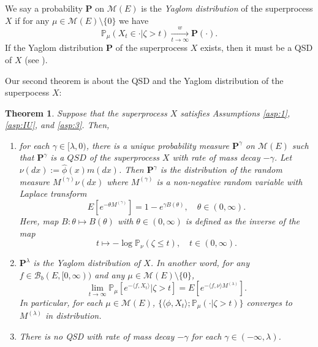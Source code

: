 \documentclass[12pt,a4paper]{amsart}
\numberwithin{equation}{section}
\theoremstyle{plain}
\newtheorem{thm}{Theorem}[section]
\theoremstyle{definition}
\begin{document}
We say a probability ${\mathbf P}$ on $\mathcal M(E)$ is the \emph{Yaglom distribution} of the superprocess $X$ if for any $\mu\in \mathcal M(E)\setminus\{0\}$ we have
\[
	\mathbb P_\mu(X_t \in \cdot | \zeta > t) \xrightarrow[t\to \infty]{w} {\mathbf P}(\cdot).
\]
If the Yaglom distribution ${\mathbf P}$ of the superprocess $X$ exists, then it must be a QSD of $X$ (see \cite{MeleardVillemonais2012Quasistationary}).

Our second theorem is about the QSD and the Yaglom distribution of the superpocess $X$:
\begin{thm}\label{thm:qsd_thm}
  Suppose that the superprocess $X$ satisfies Assumptions \ref{asp:1}, \ref{asp:IU}, and \ref{asp:3}.
  Then,
  \begin{enumerate}
  \item \label{thm:qsd_thm_1}
    for each $\gamma\in[\lambda,0)$, there is a unique probability measure ${\mathbf P}^{\gamma}$ on $\mathcal M(E)$ such that $ {\mathbf P}^\gamma$ is a $QSD$ of the superprocess $X$ with rate of mass decay $-\gamma$.
    Let $\nu(dx):=\widehat\phi(x) m(dx)$.
    Then ${\mathbf P}^\gamma$ is the distribution of the random measure $M^{(\gamma)}\nu(dx)$ where $M^{(\gamma)}$ is a non-negative random variable with Laplace transform
    \[
      E[e^{-\theta M^{(\gamma)}}]
      = 1 - e^{\gamma B(\theta)},
      \quad \theta \in (0,\infty).
    \]
    Here, map $B: \theta \mapsto B(\theta)$ with $\theta \in (0,\infty)$ is defined as the inverse of the map
    \[
      t
      \mapsto -\log \mathbb P_\nu(\zeta \leq t),
      \quad t\in (0,\infty).
    \]
  \item
    ${\mathbf P}^\lambda$ is the Yaglom distribution of $X$.
    In another word, for any  $f\in\mathcal B_b(E,[0,\infty))$ and any $\mu\in \mathcal M(E)\setminus\{0\}$,
    \[
      \lim_{t\rightarrow\infty}\mathbb P_{\mu}[e^{-\langle f,X_t\rangle} | \zeta>t]
      = E [e^{- \langle f,\nu\rangle M^{(\lambda)}}].
    \]
    In particular, for each $\mu \in \mathcal M(E)$, $\{\langle \phi, X_t\rangle; \mathbb P_{\mu}(\cdot| \zeta > t) \}$ converges to $M^{(\lambda)}$ in distribution.
  \item
    There is no QSD with rate of mass decay $-\gamma$ for each $\gamma\in(-\infty , \lambda)$.
  \end{enumerate}
\end{thm}
\end{document}

